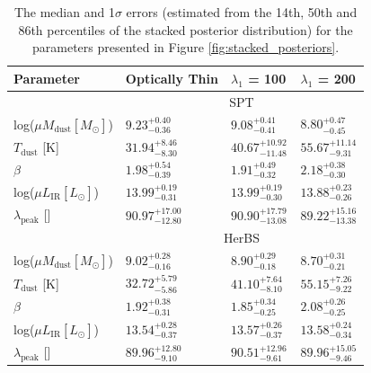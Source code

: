 \begin{table}
    \centering
    \begin{tabular}{p{3cm}|p{2.5cm}|p{2.5cm}|p{2.5cm}}
        \hline
		\hline
		Parameter & Optically Thin & $\lambda_1$ = 100\,\micron & $\lambda_1$ = 200\,\micron \\
		\hline
		\hline
		 & \multicolumn{3}{c}{SPT} \\
        \hline
        log($\mu M_{\textrm{dust}} [M_\odot]$) & $9.23_{-0.36}^{+0.40}$ & $9.08_{-0.41}^{+0.41}$ & $8.80_{-0.45}^{+0.47}$ \\
		$T_{\textrm{dust}}$ [K] & $31.94_{-8.30}^{+8.46}$ & $40.67_{-11.48}^{+10.92}$ & $55.67_{-9.31}^{+11.14}$ \\
		$\beta$ & $1.98_{-0.39}^{+0.54}$ & $1.91_{-0.32}^{+0.49}$ & $2.18_{-0.30}^{+0.38}$ \\
		log($\mu L_{\textrm{IR}} [L_\odot]$) & $13.99_{-0.31}^{+0.19}$ & $13.99_{-0.30}^{+0.19}$ & $13.88_{-0.26}^{+0.23}$ \\
		$\lambda_{\textrm{peak}}$ [\micron] & $90.97_{-12.80}^{+17.00}$ & $90.90_{-13.08}^{+17.79}$ & $89.22_{-13.38}^{+15.16}$ \\
		\hline
		& \multicolumn{3}{c}{HerBS} \\
        \hline
        log($\mu M_{\textrm{dust}} [M_\odot]$) & $9.02_{-0.16}^{+0.28}$ & $8.90_{-0.18}^{+0.29}$ & $8.70_{-0.21}^{+0.31}$ \\
		$T_{\textrm{dust}}$ [K] & $32.72_{-5.86}^{+5.79}$ & $41.10_{-8.10}^{+7.64}$ & $55.15_{-9.22}^{+7.26}$ \\
		$\beta$ & $1.92_{-0.31}^{+0.38}$ & $1.85_{-0.25}^{+0.34}$ & $2.08_{-0.25}^{+0.26}$ \\
		log($\mu L_{\textrm{IR}} [L_\odot]$) & $13.54_{-0.37}^{+0.28}$ & $13.57_{-0.37}^{+0.26}$ & $13.58_{-0.34}^{+0.24}$ \\
		$\lambda_{\textrm{peak}}$ [\micron] & $89.96_{-9.10}^{+12.80}$ & $90.51_{-9.61}^{+12.96}$ & $89.96_{-9.46}^{+15.05}$ \\
        \hline
    \end{tabular}
    \caption[Median values of far-IR to mm SED parameters]{The median and 1$\sigma$ errors (estimated from the 14th, 50th and 86th percentiles of the stacked posterior distribution) for the parameters presented in Figure \ref{fig:stacked_posteriors}.}
    \label{tab:parameter_results}
\end{table}

